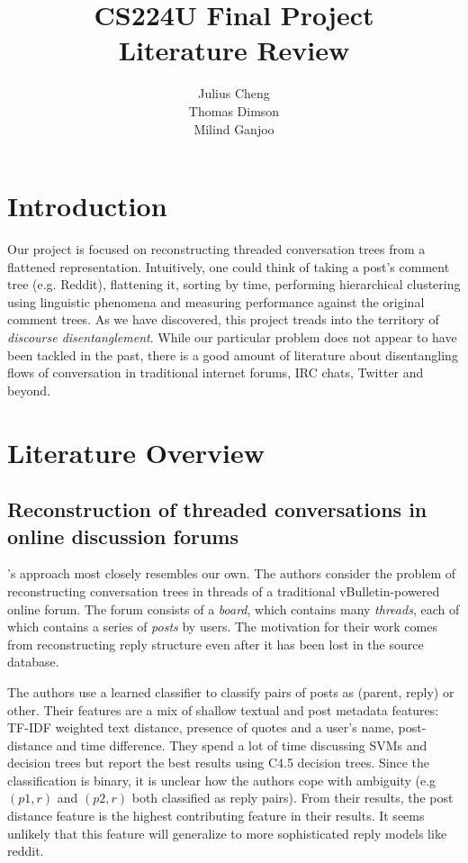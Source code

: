 \documentclass{article}
\title{CS224U Final Project \\Literature Review}
\author{Julius Cheng\\ Thomas Dimson \\ Milind Ganjoo}
\begin{document}
\maketitle

\section{Introduction}
Our project is focused on reconstructing threaded conversation trees
from a flattened representation. Intuitively, one could think of 
taking a post's comment tree (e.g. Reddit), flattening it, sorting by time, performing
hierarchical clustering using linguistic phenomena and measuring performance 
against the original comment trees. As we have
discovered, this project treads into the territory of \textit{discourse disentanglement}.
While our particular problem does not appear to have been tackled in the past,
there is a good amount of literature about disentangling flows of conversation
in traditional internet forums, IRC chats, Twitter and beyond.

\section{Literature Overview}
\subsection{Reconstruction of threaded conversations in online discussion forums}
\cite{Aumayr2011a}'s approach most closely resembles our own. The
authors consider the problem of reconstructing conversation trees in threads
of a traditional vBulletin-powered online forum. The forum consists of a
\textit{board}, which contains many \textit{threads},
each of which contains a series of \textit{posts} by users. The motivation for
their work comes from reconstructing reply structure even after it has been lost
in the source database.

The authors use a learned classifier to classify pairs of posts as (parent,
reply) or other. Their features are a mix of shallow textual and post
metadata features: TF-IDF weighted text distance, presence of quotes and a
user's name, post-distance and time difference. 
They spend a lot of time discussing SVMs and decision trees but report the best
results using C4.5 decision trees. Since the classification is binary, it 
is unclear how the authors  cope with ambiguity (e.g $(p1, r)$ and $(p2,r)$ both 
classified as reply pairs).
From their results, the post distance feature is the highest contributing feature
in their results. It seems unlikely that this feature will generalize to more
sophisticated reply models like reddit. 
\end{document}

